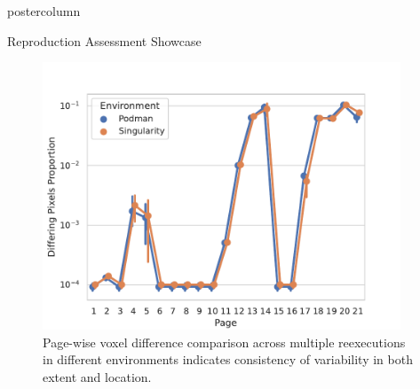 \begin{frame}
\begin{columns}
\begin{column}{.59\textwidth}
\begin{beamercolorbox}[center]{postercolumn}
\begin{minipage}{.98\textwidth}
{\begin{myblock}{Reproduction Assessment Showcase}
\begin{minipage}{.58\textwidth}
\begin{figure}
							\includegraphics[width=0.95\textwidth]{img/diff_pages.pdf}
							\vspace{0.2em}
							\caption{
								Page-wise voxel difference comparison across multiple reexecutions in different environments indicates consistency of variability in both extent and location.
							}
							\label{fig:ras_s}
						\end{figure}
						\begin{figure}

\end{figure}
\end{minipage}
\end{myblock}}
\end{minipage}
\end{beamercolorbox}
\end{column}
\end{columns}
\end{frame}

